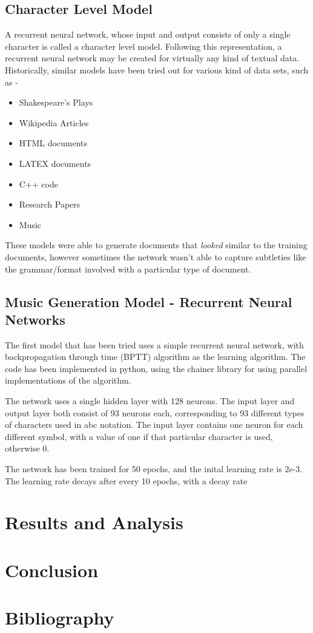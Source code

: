 \documentclass[11pt]{article}
\begin{document}
\subsection{Character Level Model}
A recurrent neural network, whose input and output consists of only a single character is called a character level model. Following this representation, a recurrent neural network may be created for virtually any kind of textual data. Historically, similar models have been tried out for various kind of data sets, such as -
\begin{itemize}
\item Shakespeare's Plays
\item Wikipedia Articles
\item HTML documents
\item LATEX documents
\item C++ code
\item Research Papers
\item Music
\end{itemize}

These models were able to generate documents that \emph{looked} similar to the training documents, however sometimes the network wasn't able to capture subtleties like the grammar/format involved with a particular type of document.

\subsection{Music Generation Model - Recurrent Neural Networks}
The first model that has been tried uses a simple recurrent neural network, with backpropagation through time (BPTT) algorithm as the learning algorithm. The code has been implemented in python, using the chainer library for using parallel implementations of the algorithm.

The network uses a single hidden layer with 128 neurons. The input layer and output layer both consist of 93 neurons each, corresponding to 93 different types of characters used in abc notation. The input layer contains one neuron for each different symbol, with a value of one if that particular character is used, otherwise 0. 

The network has been trained for 50 epochs, and the inital learning rate is 2e-3. The learning rate decays after every 10 epochs, with a decay rate

\section{Results and Analysis}
\section{Conclusion}
\section{Bibliography}
\end{document}
